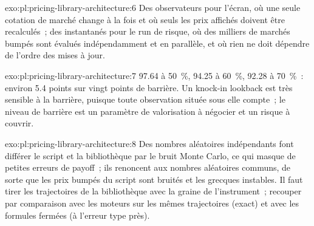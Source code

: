 \begin{solution}{exo:pl:pricing-library-architecture:6}
Des observateurs pour l'écran, où une seule cotation de marché change à la fois et où seuls les prix affichés doivent être recalculés~; des instantanés pour le run de risque,
où des milliers de marchés bumpés sont évalués indépendamment et en parallèle, et où rien ne doit dépendre de l'ordre des mises à jour.
\end{solution}

\begin{solution}{exo:pl:pricing-library-architecture:7}
97.64 à 50~\%, 94.25 à 60~\%, 92.28 à 70~\%~: environ 5.4 points sur vingt points de barrière. Un knock-in lookback est très sensible à la
barrière, puisque toute observation située sous elle compte~; le niveau de barrière est un paramètre de valorisation à négocier et un risque à couvrir.
\end{solution}

\begin{solution}{exo:pl:pricing-library-architecture:8}
Des nombres aléatoires indépendants font différer le script et la bibliothèque par le bruit Monte Carlo, ce qui masque de petites erreurs de payoff~; ils renoncent
aux nombres aléatoires communs, de sorte que les prix bumpés du script sont bruités et les grecques instables. Il faut tirer les trajectoires de la bibliothèque avec la graine de l'instrument~; recouper
par comparaison avec les moteurs sur les mêmes trajectoires (exact) et avec les formules fermées (à l'erreur type près).
\end{solution}

